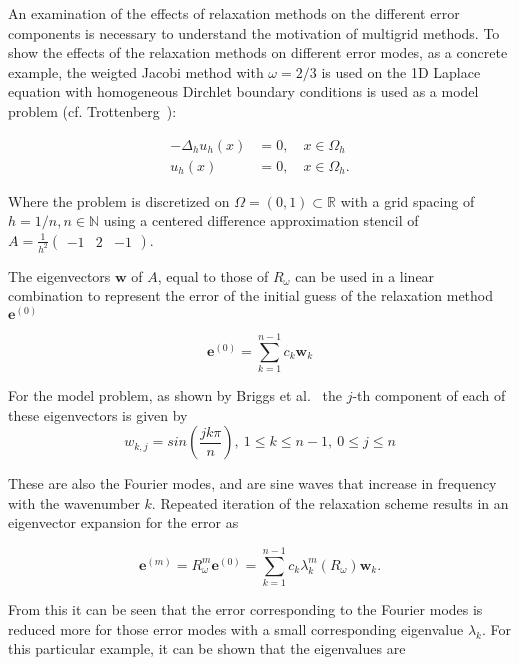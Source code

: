 An examination of the effects of relaxation methods on the different error components is necessary to understand the motivation of multigrid methods. To show the effects of the relaxation methods on different error modes, as a concrete example, the weigted Jacobi method with $\omega = 2/3$ is used on the 1D Laplace equation with homogeneous Dirchlet boundary conditions is used as a model problem (cf. Trottenberg~\cite{Trottenberg2001}):

\begin{equation}
\begin{aligned}
	-\Delta_h u_h(x) &= 0, \quad x \in \Omega_h \\
	u_h(x) &= 0, \quad x \in \Omega_h.
\end{aligned}
\label{eq:model_problem}
\end{equation}

Where the problem is discretized on $\Omega = (0, 1) \subset \mathbb{R}$ with a grid spacing of $h = 1/n, n \in \mathbb{N}$ using a centered difference approximation stencil of $A = \frac{1}{h^2} \begin{pmatrix} -1 & 2 &-1 \end{pmatrix}$.

The eigenvectors $\mathbf{w}$ of $A$, equal to those of $R_{\omega}$ can be used in a linear combination to represent the error of the initial guess of the relaxation method $\mathbf{e}^{(0)}$

\begin{equation}
	\mathbf{e}^{(0)} = \sum_{k=1}^{n-1}{c_{k}\mathbf{w}_{k}}
\end{equation}

For the model problem, as shown by Briggs et al.~\cite{Briggs2000} the $j$-th component of each of these eigenvectors is given by
\begin{equation}
	w_{k,j} = sin\left(\frac{jk\pi}{n}\right),\ 1 \leq k \leq n-1,\ 0 \leq j \leq n
\end{equation}

These are also the Fourier modes, and are sine waves that increase in frequency with the wavenumber $k$. Repeated iteration of the relaxation scheme results in an eigenvector expansion for the error as

\begin{equation}
	\mathbf{e}^{(m)} = R_{\omega}^m \mathbf{e}^{(0)} = \sum_{k=1}^{n-1}{c_k\lambda_k^m\left( R_{\omega}\right)\mathbf{w}_k}.
\end{equation}

From this it can be seen that the error corresponding to the Fourier modes is reduced more for those error modes with a small corresponding eigenvalue $\lambda_k$. For this particular example, it can be shown that the eigenvalues are


